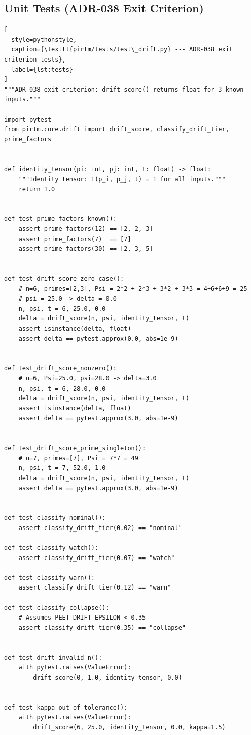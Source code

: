 \documentclass[11pt,letterpaper]{article}
\theoremstyle{definition}
\theoremstyle{remark}
\begin{document}
\subsection{Unit Tests (ADR-038 Exit Criterion)}

\begin{lstlisting}[
  style=pythonstyle,
  caption={\texttt{pirtm/tests/test\_drift.py} --- ADR-038 exit criterion tests},
  label={lst:tests}
]
"""ADR-038 exit criterion: drift_score() returns float for 3 known inputs."""

import pytest
from pirtm.core.drift import drift_score, classify_drift_tier, prime_factors


def identity_tensor(pi: int, pj: int, t: float) -> float:
    """Identity tensor: T(p_i, p_j, t) = 1 for all inputs."""
    return 1.0


def test_prime_factors_known():
    assert prime_factors(12) == [2, 2, 3]
    assert prime_factors(7)  == [7]
    assert prime_factors(30) == [2, 3, 5]


def test_drift_score_zero_case():
    # n=6, primes=[2,3], Psi = 2*2 + 2*3 + 3*2 + 3*3 = 4+6+6+9 = 25
    # psi = 25.0 -> delta = 0.0
    n, psi, t = 6, 25.0, 0.0
    delta = drift_score(n, psi, identity_tensor, t)
    assert isinstance(delta, float)
    assert delta == pytest.approx(0.0, abs=1e-9)


def test_drift_score_nonzero():
    # n=6, Psi=25.0, psi=28.0 -> delta=3.0
    n, psi, t = 6, 28.0, 0.0
    delta = drift_score(n, psi, identity_tensor, t)
    assert isinstance(delta, float)
    assert delta == pytest.approx(3.0, abs=1e-9)


def test_drift_score_prime_singleton():
    # n=7, primes=[7], Psi = 7*7 = 49
    n, psi, t = 7, 52.0, 1.0
    delta = drift_score(n, psi, identity_tensor, t)
    assert delta == pytest.approx(3.0, abs=1e-9)


def test_classify_nominal():
    assert classify_drift_tier(0.02) == "nominal"

def test_classify_watch():
    assert classify_drift_tier(0.07) == "watch"

def test_classify_warn():
    assert classify_drift_tier(0.12) == "warn"

def test_classify_collapse():
    # Assumes PEET_DRIFT_EPSILON < 0.35
    assert classify_drift_tier(0.35) == "collapse"


def test_drift_invalid_n():
    with pytest.raises(ValueError):
        drift_score(0, 1.0, identity_tensor, 0.0)


def test_kappa_out_of_tolerance():
    with pytest.raises(ValueError):
        drift_score(6, 25.0, identity_tensor, 0.0, kappa=1.5)
\end{lstlisting}
\end{document}
